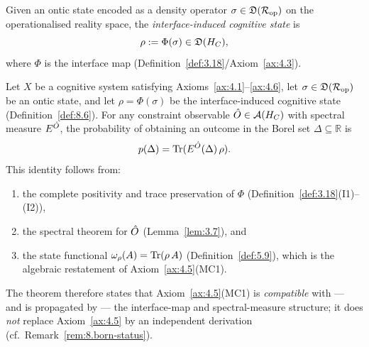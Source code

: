 \begin{definition}
\label{def:8.6}
Given an ontic state encoded as a density operator
$\sigma \in \mathfrak{D}(\mathcal{R}_{\mathrm{op}})$ on the operationalised
reality space, the \emph{interface-induced cognitive state} is
\[
  \rho := \Phi(\sigma) \in \mathfrak{D}(H_C),
\]
where $\Phi$ is the interface map
(Definition~\ref{def:3.18}/Axiom~\ref{ax:4.3}).
\end{definition}

\begin{theorem}
\label{thm:8.2}
Let $X$ be a cognitive system satisfying
Axioms~\textup{\ref{ax:4.1}}--\textup{\ref{ax:4.6}}, let
$\sigma \in \mathfrak{D}(\mathcal{R}_{\mathrm{op}})$ be an ontic state, and
let $\rho = \Phi(\sigma)$ be the interface-induced cognitive state
\textup{(}Definition~\textup{\ref{def:8.6})}.  For any constraint
observable $\hat{O} \in \mathcal{A}(H_C)$ with spectral measure $E^{\hat{O}}$,
the probability of obtaining an outcome in the Borel set
$\Delta \subseteq \mathbb{R}$ is
\[
  p(\Delta) = \mathrm{Tr}(E^{\hat{O}}(\Delta)\,\rho).
\]
This identity follows from:
\begin{enumerate}
  \item[\textup{(i)}] the complete positivity and trace preservation
    of $\Phi$ \textup{(}Definition~\textup{\ref{def:3.18}(I1)--(I2))},
  \item[\textup{(ii)}] the spectral theorem for $\hat{O}$
    \textup{(}Lemma~\textup{\ref{lem:3.7})}, and
  \item[\textup{(iii)}] the state functional
    $\omega_\rho(A) = \mathrm{Tr}(\rho\,A)$
    \textup{(}Definition~\textup{\ref{def:5.9})}, which is the
    algebraic restatement of Axiom~\textup{\ref{ax:4.5}(MC1)}.
\end{enumerate}
The theorem therefore states that Axiom~\textup{\ref{ax:4.5}(MC1)} is
\emph{compatible} with — and is propagated by — the interface-map and
spectral-measure structure; it does \emph{not} replace
Axiom~\textup{\ref{ax:4.5}} by an independent derivation
(cf.~Remark~\textup{\ref{rem:8.born-status}}).
\end{theorem}


